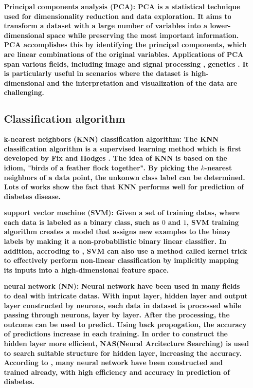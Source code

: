 \documentclass[twocolumn,10pt]{article}
\begin{document}
\bf{Principal components analysis (PCA)}: \rm{PCA} is a statistical technique used for dimensionality 
reduction and data exploration. It aims to transform a dataset with a large number of variables into 
a lower-dimensional space while preserving the most important information. PCA accomplishes this by 
identifying the principal components, which are linear combinations of the original variables. 
Applications of PCA span various fields, including image \cite{ma2019dimension} \cite{YANG20021997} 
and signal processing \cite{6497960} \cite{castells2007principal}, genetics \cite{reich2008principal} 
\cite{novembre2008interpreting}. It is particularly useful in scenarios where the dataset is 
high-dimensional and the interpretation and visualization of the data are challenging.

\subsection*{Classification algorithm}

\bf{k-nearest neighbors (KNN) classification algorithm}: \rm{The} KNN classification algorithm is a 
supervised learning method which is first developed by Fix and Hodges \cite{10.2307/1403797}. The idea 
of KNN is based on the idiom, "birds of a feather flock together". By picking the $k$-nearest neighbors 
of a data point, the unkonwn class label can be determined. Lots of works \cite{6528591} \cite{8276012} 
\cite{vijayan2014study} show the fact that KNN performs  well for prediction of diabetes disease.

\bf{support vector machine (SVM)}: \rm{Given} a set of training datas, where each data is labeled as a 
binary class, such as $0$ and $1$, SVM training algorithm creates a model that assigns new examples to 
the binay labels by making it a non-probabilistic binary linear classifier. In addition, accroding to 
\cite{amari1999improving} \cite{hofmann2006support}, SVM can also use a method called kernel trick to 
effectively perform non-linear classification by implicitly mapping its inputs into a high-dimensional 
feature space.

\bf{neural network (NN)}: \rm{Neural} network have been used in many fields to deal with intricate datas. 
With input layer, hidden layer and output layer constructed by neurons, each data in dataset is processed 
while passing through neurons, layer by layer. After the processing, the outcome can be used to predict. 
Using back propogation, the accuracy of predictions increase in each training. In order to construct the 
hidden layer more efficient, NAS(Neural Arcitecture Searching) is used to search suitable structure for 
hidden layer, increasing the accuracy. According to \cite{Gadekallu2020}\cite{Beghriche2021}, many neural 
network have been constructed and trained already, with high efficiency and accuracy in prediction of 
diabetes.
\end{document}
